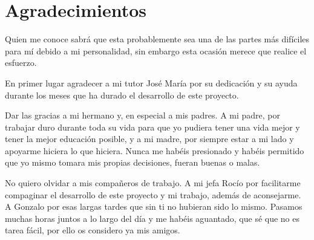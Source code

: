\chapter*{Agradecimientos}
\setlength{\parskip}{1ex}
Quien me conoce sabrá que esta probablemente sea una de las partes más difíciles para mí debido a mi personalidad, sin embargo esta ocasión merece que realice el esfuerzo.

En primer lugar agradecer a mi tutor José María por su dedicación y su ayuda durante los meses que ha durado el desarrollo de este proyecto.

Dar las gracias a mi hermano y, en especial a mis padres. A mi padre, por trabajar duro durante toda su vida para que yo pudiera tener una vida mejor y tener la mejor educación posible, y a mi madre, por siempre estar a mi lado y apoyarme hiciera lo que hiciera. Nunca me habéis presionado y habéis permitido que yo mismo tomara mis propias decisiones, fueran buenas o malas.

No quiero olvidar a mis compañeros de trabajo. A mi jefa Rocío por facilitarme compaginar el desarrollo de este proyecto y mi trabajo, además de aconsejarme. A Gonzalo por esas largas tardes que sin ti no hubieran sido lo mismo. Pasamos muchas horas juntos a lo largo del día y me habéis aguantado, que sé que no es tarea fácil, por ello os considero ya mis amigos.
